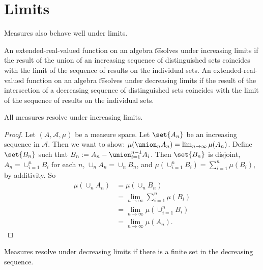 \section*{Limits}

Measures also behave well under limits.

An extended-real-valued function on an algebra \t{resolves under increasing limits} if the result of the union of an increasing sequence of distinguished sets coincides with the limit of the sequence of results on the individual sets.
An extended-real-valued function on an algebra \t{resolves under decreasing limits} if the result of the intersection of a decreasing sequence of distinguished sets coincides with the limit of the sequence of results on the individual sets.

\begin{proposition}
All measures resolve under increasing limits.
\end{proposition}

\begin{proof}Let $(A, \mathcal{A} , \mu )$ be a measure space.
Let $\set{A_n}$ be an increasing sequence in $\mathcal{A} $.
Then we want to show:
$\mu (\union_{n} A_n) = \lim_{n \to \infty} \mu (A_n)$.
Define $\set{B_n}$ such that
$B_n := A_n - \union_{i = 1}^{n-1} A_i$.
Then $\set{B_n}$ is disjoint, $A_n = \cup_{i = 1}^{n} B_i$ for each $n$, $\cup_n A_n = \cup_n B_n$, and $\mu (\cup_{i = 1}^{n} B_i) = \sum_{i = 1}^{n} \mu (B_i)$, by additivity.
So
\[
\begin{aligned}
\mu (\cup_n A_n)
&= \mu (\cup_n B_n) \\
&= \lim_{n \to \infty} \sum_{i = 1}^{n} \mu (B_i) \\
&= \lim_{n \to \infty} \mu (\cup_{i = 1}^{n} B_i) \\
&= \lim_{n \to \infty} \mu (A_n).
\end{aligned}
\]
\end{proof}
\begin{proposition}
Measures resolve under decreasing
limits if there is a finite set in
the decreasing sequence.
\end{proposition}

